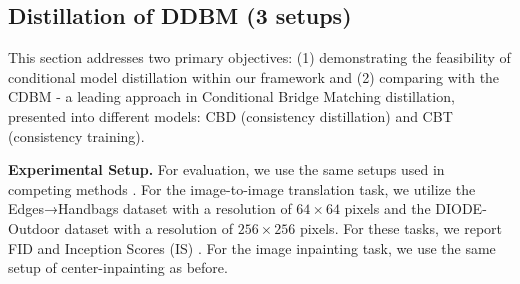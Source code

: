 \subsection{Distillation of DDBM (3 setups)}
\label{sec:ddbm experiments}
\vspace{-2mm}
This section addresses two primary objectives: (1) demonstrating the feasibility of conditional model distillation within our framework and (2) comparing with the CDBM \citep{he2024consistency} - a leading approach in Conditional Bridge Matching distillation, presented into different models: CBD (consistency distillation) and CBT (consistency training).

\textbf{Experimental Setup.} 
For evaluation, we use the same setups used in competing methods \citep{he2024consistency, zheng2024diffusion}.
For the image-to-image translation task, we utilize the Edges→Handbags dataset \cite{isola2017image} with a resolution of $64 \times 64$ pixels and the DIODE-Outdoor dataset \cite{vasiljevic2019diode} with a resolution of $256 \times 256$ pixels. For these tasks, we report FID and Inception Scores (IS) \cite{barratt2018note}.
For the image inpainting task, we use the same setup of center-inpainting as before.


